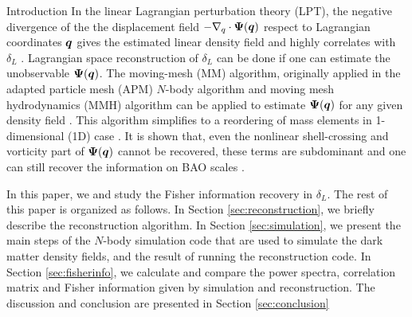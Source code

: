 \begin{section}{Introduction}
In the linear Lagrangian perturbation theory (LPT), the
negative divergence of the the displacement field
$-\nabla_q\cdot\boldsymbol\Psi(\boldsymbol q)$ respect to Lagrangian coordinates
$\boldsymbol q$ gives the estimated linear density field
\citep{bib:Zel1970} and highly
correlates with $\delta_L$ \citep{2013MNRAS.428..141N,2014PhRvD..89h3515C,bib:Yu2016}. Lagrangian space reconstruction of 
$\delta_L$ can be done if one can estimate the unobservable 
$\boldsymbol\Psi(\boldsymbol{q})$. The moving-mesh (MM) algorithm, originally 
applied in the adapted particle mesh (APM) $N$-body algorithm
\citep{bib:Pen1995} and moving mesh hydrodynamics (MMH) algorithm
\citep{bib:Pen1998} can be applied to estimate $\boldsymbol\Psi(\boldsymbol{q})$
for any given density field \citep{bib:ZhuH2016}. This algorithm
simplifies to a reordering of mass elements in 1-dimensional (1D)
case \citep{bib:Zhu2016}. It is shown that, even the nonlinear
shell-crossing and  vorticity part of $\boldsymbol\Psi(\boldsymbol{q})$ cannot be
recovered, these terms are subdominant and one can still recover
the information on BAO scales \citep{bib:ZhuH2016}.


In this paper, we  and study
the Fisher information recovery in $\delta_L$. The rest of
this paper is organized as follows. 
In Section \ref{sec:reconstruction}, we briefly describe the reconstruction algorithm.
In Section \ref{sec:simulation}, we present the main steps of the $N$-body 
simulation code that are used to simulate the dark matter density fields, 
and the result of running the reconstruction code.
In Section \ref{sec:fisherinfo}, we calculate and compare the power spectra, 
correlation matrix and Fisher information given by simulation and reconstruction.
The discussion and conclusion are presented in Section \ref{sec:conclusion}

\end{section}
